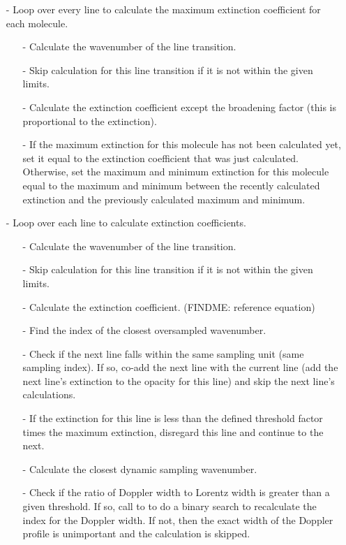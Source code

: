 \documentclass[letterpaper,12pt]{article}
\begin{document}
\begin{enumerate}[leftmargin=10pt, noitemsep, parsep=0pt, topsep=0ex]
\item[-] Loop over every line to calculate the maximum extinction coefficient for each molecule.
\begin{enumerate}[leftmargin=10pt, noitemsep, parsep=0pt, topsep=0ex]
\item[-] Calculate the wavenumber of the line transition.
\item[-] Skip calculation for this line transition if it is not within the given limits.
\item[-] Calculate the extinction coefficient except the broadening factor (this is proportional to the extinction).
\item[-] If the maximum extinction for this molecule has not been calculated yet, set it equal to the extinction coefficient that was just calculated. Otherwise, set the maximum and minimum extinction for this molecule equal to the maximum and minimum between the recently calculated extinction and the previously calculated maximum and minimum.
\end{enumerate}
\item[-] Loop over each line to calculate extinction coefficients.
\begin{enumerate}[leftmargin=10pt, noitemsep, parsep=0pt, topsep=0ex]
\item[-] Calculate the wavenumber of the line transition.
\item[-] Skip calculation for this line transition if it is not within the given limits.
\item[-] Calculate the extinction coefficient. (FINDME: reference equation)
\item[-] Find the index of the closest oversampled wavenumber.
\item[-] Check if the next line falls within the same sampling unit (same sampling index). If so, co-add the next line with the current line (add the next line's extinction to the opacity for this line) and skip the next line's calculations.
\item[-] If the extinction for this line is less than the defined threshold factor times the maximum extinction, disregard this line and continue to the next.
\item[-] Calculate the closest dynamic sampling wavenumber.
\item[-] Check if the ratio of Doppler width to Lorentz width is greater than a given threshold. If so, call to  to do a binary search to recalculate the index for the Doppler width. If not, then the exact width of the Doppler profile is unimportant and the calculation is skipped.

\end{enumerate}
\end{enumerate}
\end{document}
